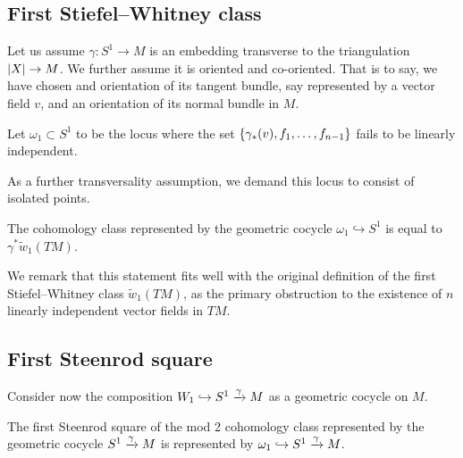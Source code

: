 \subsection*{First Stiefel--Whitney class}

Let us assume $\gamma \colon S^1 \to M$ is an embedding transverse to the triangulation $\lvert X\rvert \to M$.
We further assume it is oriented and co-oriented.
That is to say, we have chosen and orientation of its tangent bundle, say represented by a vector field $v$, and an orientation of its normal bundle in $M$.

\begin{definition}
	Let $\omega_1 \subset S^1$ to be the locus where the set $\{\gamma_\ast (v), f_1, \dots, f_{n-1}\}$ fails to be linearly independent.
\end{definition}

As a further transversality assumption, we demand this locus to consist of isolated points.

\begin{proposition}
	The cohomology class represented by the geometric cocycle $\omega_1 \hookrightarrow S^1$ is equal to $\gamma^\ast \widetilde w_1(TM)$.
\end{proposition}

We remark that this statement fits well with the original definition of the first Stiefel--Whitney class $\widetilde w_1(TM)$, as the primary obstruction to the existence of $n$ linearly independent vector fields in $TM$.


\subsection*{First Steenrod square}

Consider now the composition $W_1 \hookrightarrow S^1 \xrightarrow{\gamma} M$ as a geometric cocycle on $M$.

\begin{proposition}
	The first Steenrod square of the mod 2 cohomology class represented by the geometric cocycle $S^1 \xrightarrow{\gamma} M$ is represented by $\omega_1 \hookrightarrow S^1 \xrightarrow{\gamma} M$.
\end{proposition}

